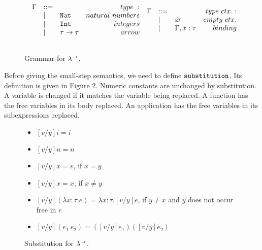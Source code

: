 \begin{figure}[h]
\vspace{-5pt}

\[
\begin{array}{lll}


\begin{array}{lllr}

\Gamma & ::= & ~ & type~: \\
	& | & \mathtt{Nat} & natural~numbers \\
	& | & \mathtt{Int} & integers \\
	& | & \tau \rightarrow \tau & arrow \\
	&&\\
	
\end{array}


\begin{array}{lllr}

\Gamma & ::= & ~ & type~ctx.: \\
	& | & \varnothing & empty~ctx. \\
	& | & \Gamma, x: \tau & binding \\
	&&\\
	
\end{array}

\end{array}
\]

\vspace{-12pt}
\caption{Grammar for $\lambda^{\rightarrow}$.}
\label{fig:stlc_type_grammar}
\end{figure}

Before giving the small-step semantics, we need to define $\mathtt{substitution}$. Its definition is given in Figure \ref{fig:stlc_sub_defn}. Numeric constants are unchanged by substitution. A variable is changed if it matches the variable being replaced. A function has the free variables in its body replaced. An application has the free variables in its subexpressions replaced.

\begin{figure}[h]


\begin{itemize}
	\setlength\itemsep{-0.7em}
	\item[] $[v/y]i = i$
	\item[] $[v/y]n = n$
	\item[] $[ v/y]x =  v$, if $x = y$
	\item[] $[ v/y]x = x$, if $x \neq y$
	\item[] $[ v/y](\lambda x:  \tau.  e) = \lambda x:  \tau.[ v/y] e$, if $y \neq x$ and $y$ does not occur free in $ e$
	\item[] $[ v/y]( e_1~ e_2) = ([ v/y] e_1)([ v/y] e_2)$
\end{itemize}

\vspace{-12pt}
\caption{Substitution for $\lambda^{\rightarrow}$.}
\label{fig:stlc_sub_defn}
\end{figure}


